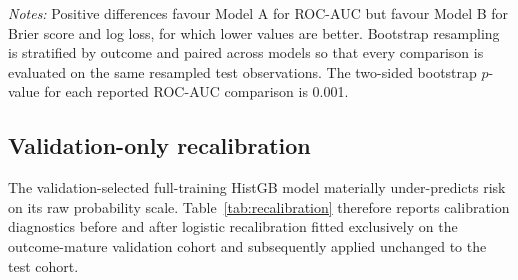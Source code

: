 \documentclass[10pt]{article}
\begin{document}
\begin{table}[!ht]
\centering
\caption{Paired stratified-bootstrap comparisons of test performance. Differences are reported as Model A minus Model B; 95\% confidence intervals are based on 2,000 paired bootstrap replicates.}
\label{tab:paired_bootstrap}

\vspace{3pt}
{\footnotesize \textit{Notes:} Positive differences favour Model A for ROC-AUC but favour Model B for Brier score and log loss, for which lower values are better. Bootstrap resampling is stratified by outcome and paired across models so that every comparison is evaluated on the same resampled test observations. The two-sided bootstrap $p$-value for each reported ROC-AUC comparison is 0.001.}
\end{table}




\subsection{Validation-only recalibration}
\label{sec:recalibration}

The validation-selected full-training HistGB model materially under-predicts risk on its raw probability scale. Table~\ref{tab:recalibration} therefore reports calibration diagnostics before and after logistic recalibration fitted exclusively on the outcome-mature validation cohort and subsequently applied unchanged to the test cohort.
\end{document}
